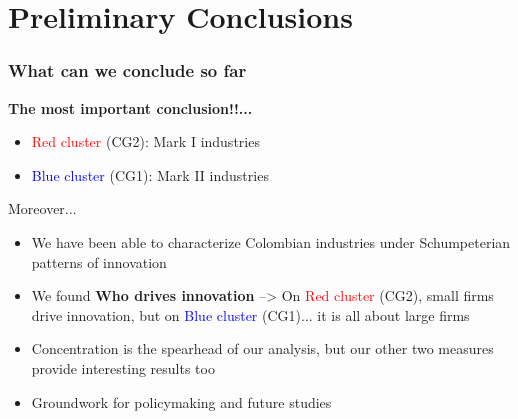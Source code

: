 \documentclass{beamer}
\begin{document}
\section{Preliminary Conclusions}
	\begin{frame}[allowframebreaks]
		\frametitle{What can we conclude so far}
		\textbf{The most important conclusion!!...}
		\begin{itemize}
			\item \textcolor{red}{Red cluster} (CG2): Mark I industries
			\item \textcolor{blue}{Blue cluster} (CG1): Mark II industries
		\end{itemize}
	\framebreak 
		Moreover...
	\begin{itemize}
		\item We have been able to characterize Colombian industries under Schumpeterian patterns of innovation
		\item We found \textbf{Who drives innovation} --> On \textcolor{red}{Red cluster} (CG2), small firms drive innovation, but on \textcolor{blue}{Blue cluster} (CG1)...  it is all about large firms
		\item Concentration is the spearhead of our analysis, but our other two measures provide interesting results too
		\item Groundwork for policymaking and future studies
	\end{itemize}
	\end{frame}
\end{document}

